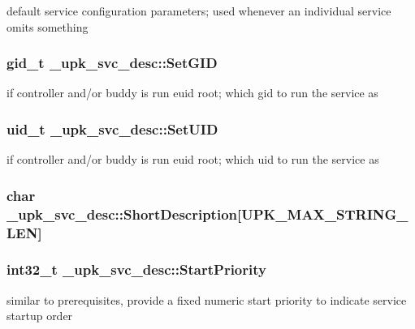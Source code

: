 default service configuration parameters; used whenever an individual service omits something 
\subsubsection{\setlength{\rightskip}{0pt plus 5cm}gid\_\-t \bf{\_\-upk\_\-svc\_\-desc::Set\-GID}\hspace{0.3cm}{\tt  [inherited]}}\label{group__config__impl_ge57bbbdf5f0dbb070e71bdb332931f46}


if controller and/or buddy is run euid root; which gid to run the service as 
\subsubsection{\setlength{\rightskip}{0pt plus 5cm}uid\_\-t \bf{\_\-upk\_\-svc\_\-desc::Set\-UID}\hspace{0.3cm}{\tt  [inherited]}}\label{group__config__impl_g8da474c10d5ed176d0b9d99fff945e57}


if controller and/or buddy is run euid root; which uid to run the service as 
\subsubsection{\setlength{\rightskip}{0pt plus 5cm}char \bf{\_\-upk\_\-svc\_\-desc::Short\-Description}[UPK\_\-MAX\_\-STRING\_\-LEN]\hspace{0.3cm}{\tt  [inherited]}}\label{group__config__impl_gf888e9b6f99b52b41ac3f946f14e4dca}


\subsubsection{\setlength{\rightskip}{0pt plus 5cm}int32\_\-t \bf{\_\-upk\_\-svc\_\-desc::Start\-Priority}\hspace{0.3cm}{\tt  [inherited]}}\label{group__config__impl_g35d1ef7bff6ac5405edf34ea697fdc91}


similar to prerequisites, provide a fixed numeric start priority to indicate service startup order 
